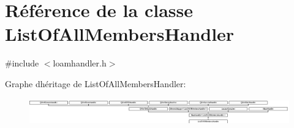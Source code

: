 \hypertarget{class_list_of_all_members_handler}{}\section{Référence de la classe List\+Of\+All\+Members\+Handler}
\label{class_list_of_all_members_handler}


{\ttfamily \#include $<$loamhandler.\+h$>$}

Graphe d\textquotesingle{}héritage de List\+Of\+All\+Members\+Handler\+:\begin{figure}[H]
\begin{center}
\leavevmode
\includegraphics[height=1.155235cm]{class_list_of_all_members_handler}
\end{center}
\end{figure}
